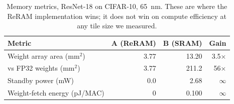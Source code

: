\begin{table}[t]
\centering
\caption{Memory metrics, ResNet-18 on CIFAR-10, \SI{65}{\nano\meter}. These are where the ReRAM implementation wins; it does not win on compute efficiency at any tile size we measured.}
\label{tab:memory}
\begin{tabular}{lrrr}
\toprule
Metric & A (ReRAM) & B (SRAM) & Gain \\
\midrule
Weight array area (mm$^2$) & 3.77 & 13.20 & 3.5$\times$ \\
vs FP32 weights (mm$^2$) & 3.77 & 211.2 & 56$\times$ \\
Standby power (mW) & 0.0 & 2.68 & $\infty$ \\
Weight-fetch energy (pJ/MAC) & 0 & 0.100 & $\infty$ \\
\bottomrule
\end{tabular}
\end{table}
